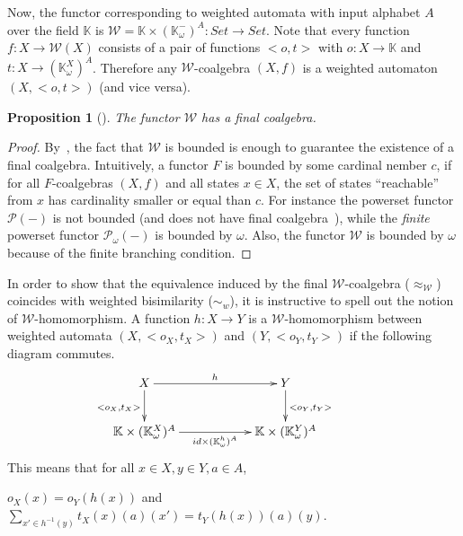 \documentclass[3p]{elsarticle}
\newcommand{\cbox}[1]{\vspace{0.2cm}\noindent
  \fbox{\parbox{.97\textwidth}{#1}}\vspace{0.2cm}}
\newcommand{\fW}{\mathcal{W}}    %
\newcommand{\setproduct}{\times} %
\newcommand{\comp}{\circ}               %
\newcommand{\K}{\mathbb{K}}            %
\newtheorem{proposition}{Proposition}
\begin{document}
Now, the functor corresponding to weighted automata with input
alphabet $A$ over the field $\K$ is $\fW=\K \setproduct
(\K_{\omega}^{-})^A\colon   Set \to Set$.
%
%
%
%
%
Note that every function $f\colon  X\to \fW(X)$ consists of a pair
of functions $<o,t>$ with $o\colon  X\to \K$ and $t\colon  X \to
(\K_{\omega}^{X})^A$. Therefore any $\fW$-coalgebra $(X,f)$ is a
weighted automaton $(X,<o,t>)$ (and vice versa).
%
\begin{proposition}[\cite{thesis}]
The functor $\fW$ has a final coalgebra.
\end{proposition}
\begin{proof}
By~\cite[Theorem 7.2]{GS01}, the fact that $\fW$ is bounded is enough to guarantee the existence of a final
coalgebra.
Intuitively, a functor $F$ is bounded by some cardinal nember $c$, if for all $F$-coalgebras $(X,f)$ and all states $x\in X$,
the set of states ``reachable'' from $x$ has cardinality smaller or equal than $c$. For instance the powerset functor
${\mathcal P}(-)$ is not bounded (and does not have final coalgebra~\cite{Rutten00}), while the \emph{finite}
powerset functor ${\mathcal P_\omega}(-)$ is bounded by $\omega$.
Also, the functor $\fW$ is bounded by $\omega$ because of the finite branching condition.
\end{proof}

In order to show that the equivalence induced by the final
$\fW$-coalgebra ($\approx_\fW$) coincides with weighted bisimilarity
($\sim_w$), it is instructive to spell out the notion of
$\fW$-homomorphism. A function $h\colon  X\to Y$ is a
$\fW$-homomorphism between weighted automata $(X,<o_X,t_X>)$ and
$(Y,<o_Y,t_Y>)$ if the following diagram commutes.
\[
\xymatrix@C=2cm{X \ar[d]_{<o_X,t_X>}\ar[r]^{h}& Y\ar[d]^{<o_Y,t_Y>}\\
\K \setproduct(\K_{\omega}^{X})^A
\ar[r]_{id\setproduct(\K_{\omega}^{h})^A}& \K
\setproduct(\K_{\omega}^{Y})^A}\ \ \ \ \ \ \ \ \
\]
This means that for all $ x \in X, y \in Y, a\in A$,
\begin{center}
$o_X(x)=o_Y(h(x))$ and $\sum_{x'\in
h^{-1}(y)}t_X(x)(a)(x')=t_Y(h(x))(a)(y)$. \end{center}
%
\end{document}
